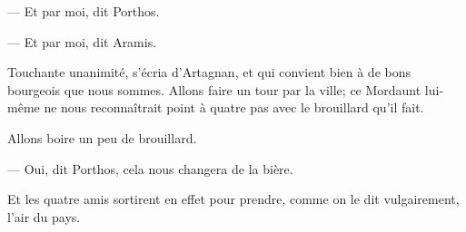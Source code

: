 — Et par moi, dit Porthos.

— Et par moi, dit Aramis.

Touchante unanimité, s'écria d'Artagnan, et qui convient bien à de bons bourgeois que nous sommes. Allons faire un tour par la ville; ce Mordaunt lui-même ne nous reconnaîtrait point à quatre pas avec le brouillard qu'il fait.

Allons boire un peu de brouillard.

— Oui, dit Porthos, cela nous changera de la bière.

Et les quatre amis sortirent en effet pour prendre, comme on le dit vulgairement, l'air du pays.
